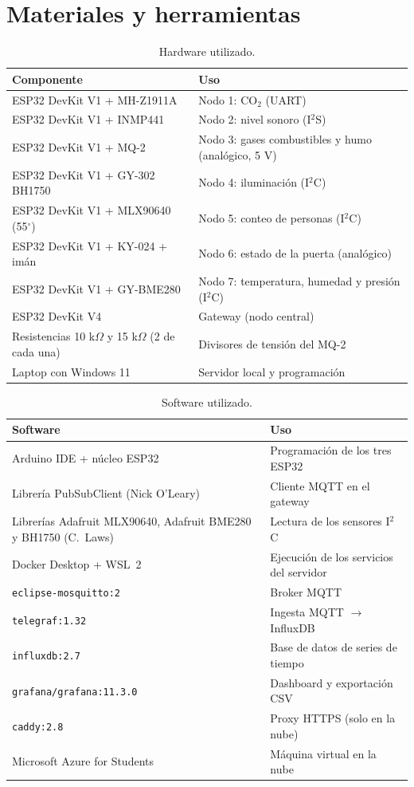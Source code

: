 \documentclass[11pt,a4paper]{article}
\begin{document}
\section{Materiales y herramientas}

\begin{table}[H]
\centering
\caption{Hardware utilizado.}
\begin{tabularx}{\textwidth}{@{}lX@{}}
\toprule
\textbf{Componente} & \textbf{Uso} \\
\midrule
ESP32 DevKit V1 + MH-Z1911A & Nodo 1: CO$_2$ (UART) \\
ESP32 DevKit V1 + INMP441 & Nodo 2: nivel sonoro (I$^2$S) \\
ESP32 DevKit V1 + MQ-2 & Nodo 3: gases combustibles y humo (anal\'ogico, 5 V) \\
ESP32 DevKit V1 + GY-302 BH1750 & Nodo 4: iluminaci\'on (I$^2$C) \\
ESP32 DevKit V1 + MLX90640 (55$^\circ$) & Nodo 5: conteo de personas (I$^2$C) \\
ESP32 DevKit V1 + KY-024 + im\'an & Nodo 6: estado de la puerta (anal\'ogico) \\
ESP32 DevKit V1 + GY-BME280 & Nodo 7: temperatura, humedad y presi\'on (I$^2$C) \\
ESP32 DevKit V4 & Gateway (nodo central) \\
Resistencias 10 k$\Omega$ y 15 k$\Omega$ (2 de cada una) & Divisores de tensi\'on del MQ-2 \\
Laptop con Windows 11 & Servidor local y programaci\'on \\
\bottomrule
\end{tabularx}
\end{table}

\begin{table}[H]
\centering
\caption{Software utilizado.}
\begin{tabularx}{\textwidth}{@{}lX@{}}
\toprule
\textbf{Software} & \textbf{Uso} \\
\midrule
Arduino IDE + n\'ucleo ESP32 & Programaci\'on de los tres ESP32 \\
Librer\'ia PubSubClient (Nick O'Leary) & Cliente MQTT en el gateway \\
Librer\'ias Adafruit MLX90640, Adafruit BME280 y BH1750 (C.\ Laws) & Lectura de los sensores I$^2$C \\
Docker Desktop + WSL~2 & Ejecuci\'on de los servicios del servidor \\
\texttt{eclipse-mosquitto:2} & Broker MQTT \\
\texttt{telegraf:1.32} & Ingesta MQTT $\rightarrow$ InfluxDB \\
\texttt{influxdb:2.7} & Base de datos de series de tiempo \\
\texttt{grafana/grafana:11.3.0} & Dashboard y exportaci\'on CSV \\
\texttt{caddy:2.8} & Proxy HTTPS (solo en la nube) \\
Microsoft Azure for Students & M\'aquina virtual en la nube \\
\bottomrule
\end{tabularx}
\end{table}
\end{document}
